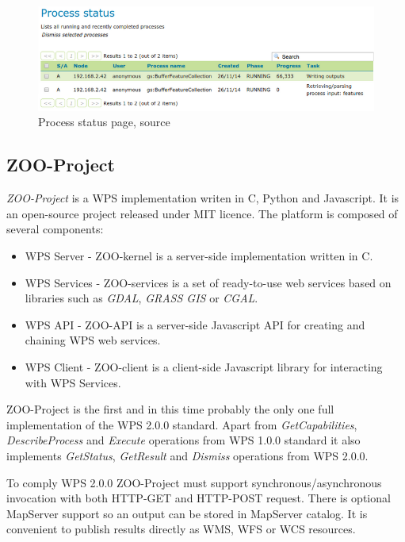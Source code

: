 \begin{figure}[h!]
\centering
\includegraphics[width=\textwidth]{img/geoserver_status.png}
\caption{Process status page, source \cite{GS_docs}}
\label{fig:geoserver_status}
\end{figure}

\subsection{ZOO-Project}
\textit{ZOO-Project} is a WPS implementation writen in C, Python and Javascript. It is an open-source project released under MIT licence.
The platform is composed of several components:

\begin{itemize}
\item WPS Server - ZOO-kernel is a server-side implementation written in C.
\item WPS Services - ZOO-services is a set of ready-to-use web services based on libraries such as \textit{GDAL}, \textit{GRASS GIS}
or \textit{CGAL}.
\item WPS API - ZOO-API is a server-side Javascript API for creating and chaining WPS web services.
\item WPS Client - ZOO-client is a client-side Javascript library for interacting with WPS Services.
\end{itemize}

ZOO-Project is the first and in this time probably the only one full implementation of the WPS 2.0.0 standard. Apart from \textit{GetCapabilities},
\textit{DescribeProcess} and \textit{Execute} operations from WPS 1.0.0 standard it also implements \textit{GetStatus}, \textit{GetResult}
and \textit{Dismiss} operations from WPS 2.0.0.

To comply WPS 2.0.0 ZOO-Project must support synchronous/asynchronous
invocation with both HTTP-GET and HTTP-POST request. There is optional 
MapServer support so an output can be stored in MapServer catalog. It is convenient to publish
results directly as WMS, WFS or WCS resources.

